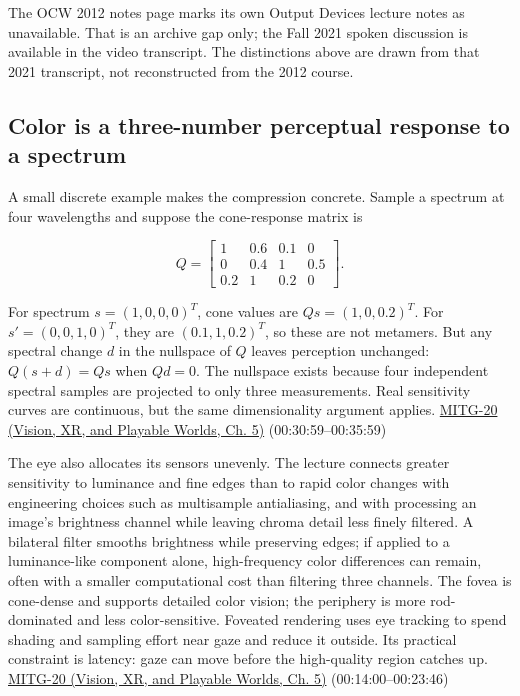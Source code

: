 The OCW 2012 notes page marks its own Output Devices lecture notes as unavailable. That is an archive gap only; the Fall 2021 spoken discussion is available in the video transcript. The distinctions above are drawn from that 2021 transcript, not reconstructed from the 2012 course.

\subsection{Color is a three-number perceptual response to a spectrum}\label{03-visual-computing-i-ch004-color-is-a-three-number-perceptual-response-to-a-spectrum}

\hypertarget{03-visual-computing-i-ch004-color-is-a-three-number-perceptual-response-to-a-spectrum}{}

A small discrete example makes the compression concrete. Sample a spectrum at four wavelengths and suppose the cone-response matrix is

\[
Q=\begin{bmatrix}1&0.6&0.1&0\\0&0.4&1&0.5\\0.2&1&0.2&0\end{bmatrix}.
\]

For spectrum \(s=(1,0,0,0)^T\), cone values are \(Qs=(1,0,0.2)^T\). For \(s'=(0,0,1,0)^T\), they are \((0.1,1,0.2)^T\), so these are not metamers. But any spectral change \(d\) in the nullspace of \(Q\) leaves perception unchanged: \(Q(s+d)=Qs\) when \(Qd=0\). The nullspace exists because four independent spectral samples are projected to only three measurements. Real sensitivity curves are continuous, but the same dimensionality argument applies. \href{../07-Vision-XR-and-Playable-Worlds/main.pdf\#nameddest=04-visual-computing-ii-ch036-mitg-20---color}{MITG-20 (Vision, XR, and Playable Worlds, Ch. 5)} (00:30:59--00:35:59)

The eye also allocates its sensors unevenly. The lecture connects greater sensitivity to luminance and fine edges than to rapid color changes with engineering choices such as multisample antialiasing, and with processing an image's brightness channel while leaving chroma detail less finely filtered. A bilateral filter smooths brightness while preserving edges; if applied to a luminance-like component alone, high-frequency color differences can remain, often with a smaller computational cost than filtering three channels. The fovea is cone-dense and supports detailed color vision; the periphery is more rod-dominated and less color-sensitive. Foveated rendering uses eye tracking to spend shading and sampling effort near gaze and reduce it outside. Its practical constraint is latency: gaze can move before the high-quality region catches up. \href{../07-Vision-XR-and-Playable-Worlds/main.pdf\#nameddest=04-visual-computing-ii-ch036-mitg-20---color}{MITG-20 (Vision, XR, and Playable Worlds, Ch. 5)} (00:14:00--00:23:46)

